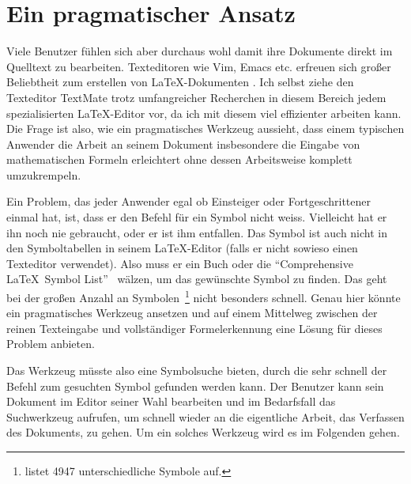\section{Ein pragmatischer Ansatz} %
\label{sec:pragmatisch}

Viele Benutzer fühlen sich aber durchaus wohl damit ihre Dokumente direkt im Quelltext zu bearbeiten. Texteditoren wie Vim, Emacs etc. erfreuen sich großer Beliebtheit zum erstellen von \LaTeX-Dokumenten \cite{latex-editor-windows, latex-editor-linux}. Ich selbst ziehe den Texteditor TextMate trotz umfangreicher Recherchen in diesem Bereich jedem spezialisierten \LaTeX-Editor vor, da ich mit diesem viel effizienter arbeiten kann. Die Frage ist also, wie ein pragmatisches Werkzeug aussieht, dass einem typischen Anwender die Arbeit an seinem Dokument insbesondere die Eingabe von mathematischen Formeln erleichtert ohne dessen Arbeitsweise komplett umzukrempeln.

Ein Problem, das jeder Anwender egal ob Einsteiger oder Fortgeschrittener einmal hat, ist, dass er den Befehl für ein Symbol nicht weiss. Vielleicht hat er ihn noch nie gebraucht, oder er ist ihm entfallen. Das Symbol ist auch nicht in den Symboltabellen in seinem \LaTeX-Editor (falls er nicht sowieso einen Texteditor verwendet). Also muss er ein Buch oder die "`Comprehensive \LaTeX\ Symbol List"'~\cite{Pakin:2009p2664} wälzen, um das gewünschte Symbol zu finden. Das geht bei der großen Anzahl an Symbolen~\footnote{\cite{Pakin:2009p2664} listet 4947 unterschiedliche Symbole auf.} nicht besonders schnell. Genau hier könnte ein pragmatisches Werkzeug ansetzen und auf einem Mittelweg zwischen der reinen Texteingabe und vollständiger Formelerkennung eine Lösung für dieses Problem anbieten.

Das Werkzeug müsste also eine Symbolsuche bieten, durch die sehr schnell der Befehl zum gesuchten Symbol gefunden werden kann. Der Benutzer kann sein Dokument im Editor seiner Wahl bearbeiten und im Bedarfsfall das Suchwerkzeug aufrufen, um schnell wieder an die eigentliche Arbeit, das Verfassen des Dokuments, zu gehen. Um ein solches Werkzeug wird es im Folgenden gehen.

% 
% 
